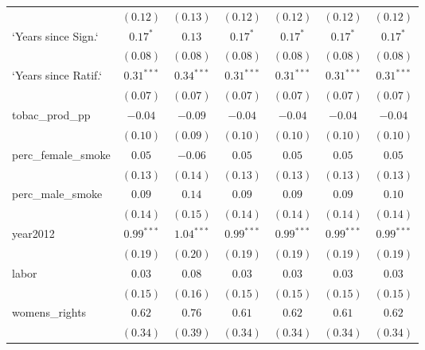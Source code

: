 \begin{table}[!h]
\begin{center}
\begin{tabular}{l c c c c c c }
                        & $(0.12)$     & $(0.13)$      & $(0.12)$     & $(0.12)$     & $(0.12)$     & $(0.12)$     \\
`Years since Sign.`     & $0.17^{*}$   & $0.13$        & $0.17^{*}$   & $0.17^{*}$   & $0.17^{*}$   & $0.17^{*}$   \\
                        & $(0.08)$     & $(0.08)$      & $(0.08)$     & $(0.08)$     & $(0.08)$     & $(0.08)$     \\
`Years since Ratif.`    & $0.31^{***}$ & $0.34^{***}$  & $0.31^{***}$ & $0.31^{***}$ & $0.31^{***}$ & $0.31^{***}$ \\
                        & $(0.07)$     & $(0.07)$      & $(0.07)$     & $(0.07)$     & $(0.07)$     & $(0.07)$     \\
tobac\_prod\_pp         & $-0.04$      & $-0.09$       & $-0.04$      & $-0.04$      & $-0.04$      & $-0.04$      \\
                        & $(0.10)$     & $(0.09)$      & $(0.10)$     & $(0.10)$     & $(0.10)$     & $(0.10)$     \\
perc\_female\_smoke     & $0.05$       & $-0.06$       & $0.05$       & $0.05$       & $0.05$       & $0.05$       \\
                        & $(0.13)$     & $(0.14)$      & $(0.13)$     & $(0.13)$     & $(0.13)$     & $(0.13)$     \\
perc\_male\_smoke       & $0.09$       & $0.14$        & $0.09$       & $0.09$       & $0.09$       & $0.10$       \\
                        & $(0.14)$     & $(0.15)$      & $(0.14)$     & $(0.14)$     & $(0.14)$     & $(0.14)$     \\
year2012                & $0.99^{***}$ & $1.04^{***}$  & $0.99^{***}$ & $0.99^{***}$ & $0.99^{***}$ & $0.99^{***}$ \\
                        & $(0.19)$     & $(0.20)$      & $(0.19)$     & $(0.19)$     & $(0.19)$     & $(0.19)$     \\
labor                   & $0.03$       & $0.08$        & $0.03$       & $0.03$       & $0.03$       & $0.03$       \\
                        & $(0.15)$     & $(0.16)$      & $(0.15)$     & $(0.15)$     & $(0.15)$     & $(0.15)$     \\
womens\_rights          & $0.62$       & $0.76$        & $0.61$       & $0.62$       & $0.61$       & $0.62$       \\
                        & $(0.34)$     & $(0.39)$      & $(0.34)$     & $(0.34)$     & $(0.34)$     & $(0.34)$     \\

\end{tabular}
\end{center}
\end{table}
